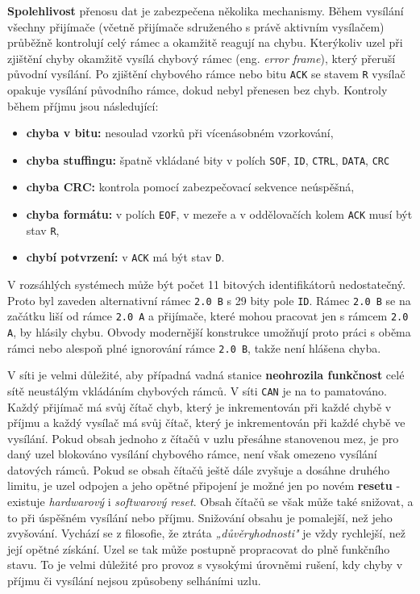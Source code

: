         \textbf{Spolehlivost} přenosu dat je zabezpečena několika mechanismy. Během vysílání 
        všechny přijímače (včetně přijímače sdruženého s právě aktivním vysílačem) průběžně 
        kontrolují celý rámec a okamžitě reagují na chybu. Kterýkoliv uzel při zjištění chyby 
        okamžitě vysílá chybový rámec (eng. \emph{error frame}), který přeruší původní vysílání. Po 
        zjištění chybového rámce nebo bitu \texttt{ACK} se stavem \texttt{R} vysílač opakuje 
        vysílání původního rámce, dokud nebyl přenesen bez 
        chyb. Kontroly během příjmu jsou následující:
        \begin{itemize}[noitemsep]
          \item \textbf{chyba v bitu:} nesoulad vzorků při vícenásobném vzorkování,
          \item \textbf{chyba stuffingu:} špatně vkládané bity v polích \texttt{SOF}, \texttt{ID}, 
                \texttt{CTRL}, \texttt{DATA}, \texttt{CRC}
          \item \textbf{chyba CRC:} kontrola pomocí zabezpečovací sekvence neúspěšná,
          \item \textbf{chyba formátu:} v polích \texttt{EOF}, v mezeře a v oddělovačích kolem  
                \texttt{ACK} musí být stav \texttt{R},
          \item \textbf{chybí potvrzení:} v \texttt{ACK} má být stav \texttt{D}.          
        \end{itemize}
        
        V rozsáhlých systémech může být počet 11 bitových identifikátorů nedostatečný. Proto byl 
        zaveden alternativní rámec \texttt{2.0 B} s 29 bity pole \texttt{ID}. Rámec \texttt{2.0 B} 
        se na začátku liší od rámce \texttt{2.0 A} a přijímače, které mohou pracovat jen s rámcem 
        \texttt{2.0 A}, by hlásily chybu. Obvody modernější konstrukce umožňují proto práci s oběma 
        rámci nebo alespoň plné ignorování rámce \texttt{2.0 B}, takže není hlášena chyba.
        
        V síti je velmi důležité, aby případná vadná stanice \textbf{neohrozila funkčnost} celé 
        sítě neustálým vkládáním chybových rámců. V síti \texttt{CAN} je na to pamatováno. Každý 
        přijímač má svůj čítač chyb, který je inkrementován při každé chybě v příjmu a každý 
        vysílač má svůj čítač, který je inkrementován při každé chybě ve vysílání. Pokud obsah 
        jednoho z čítačů v uzlu přesáhne stanovenou mez, je pro daný uzel blokováno vysílání 
        chybového rámce, není však omezeno vysílání datových rámců. Pokud se obsah čítačů ještě 
        dále zvyšuje a dosáhne druhého limitu, je uzel odpojen a jeho opětné připojení je možné jen 
        po novém \textbf{resetu} - existuje \emph{hardwarový} i \emph{softwarový reset}. Obsah 
        čítačů se však může také snižovat, a to při úspěšném vysílání nebo příjmu. Snižování 
        obsahu je pomalejší, než jeho zvyšování. Vychází se z filosofie, že ztráta 
        \emph{„důvěryhodnosti"} je vždy rychlejší, než její opětné získání. Uzel se tak může 
        postupně propracovat do plně funkčního stavu. To je velmi důležité pro provoz s vysokými 
        úrovněmi rušení, kdy chyby v příjmu či vysílání nejsou způsobeny selháními uzlu.
        
